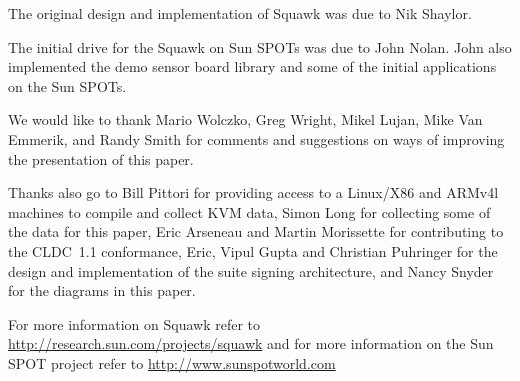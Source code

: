 \documentclass{sigplanconf}
\begin{document}
\acks

The original design and implementation of Squawk was
due to Nik Shaylor.

The initial drive for the Squawk on Sun SPOTs was due
to John Nolan.  John also implemented the demo sensor board 
library and some of the initial applications on the Sun SPOTs. 

We would like to thank Mario Wolczko, Greg Wright, Mikel Lujan, 
Mike Van Emmerik, and Randy Smith for comments and suggestions on 
ways of improving the presentation of this paper. 

Thanks also go to 
Bill Pittori for providing access to a Linux/X86 and ARMv4l machines
to compile and collect KVM data, 
Simon Long for collecting some of the data for this paper, 
Eric Arseneau and Martin Morissette for contributing to the CLDC~1.1 
conformance, 
Eric, Vipul Gupta and Christian Puhringer for the design and 
implementation of the suite signing architecture, and 
Nancy Snyder for the diagrams in this paper. 

For more information on Squawk refer to
\url{http://research.sun.com/projects/squawk}
and for more information on the Sun SPOT project refer to 
\url{http://www.sunspotworld.com}


%
%
\end{document}
